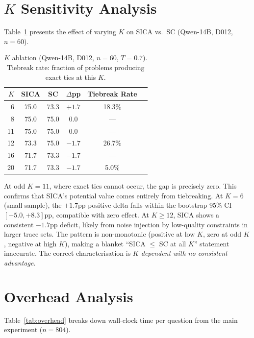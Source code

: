 \documentclass[11pt]{article}
\begin{document}
\appendix

\section{$K$ Sensitivity Analysis}
\label{app:k_ablation}

Table~\ref{tab:k_ablation} presents the effect of varying $K$ on SICA vs.\ SC (Qwen-14B, D012, $n{=}60$).

\begin{table}[h]
\centering
\caption{$K$ ablation (Qwen-14B, D012, $n{=}60$, $T{=}0.7$). Tiebreak rate: fraction of problems producing exact ties at this $K$.}
\label{tab:k_ablation}
\small
\begin{tabular}{@{}rccccr@{}}
\toprule
$K$ & SICA & SC & $\Delta$pp & Tiebreak Rate \\
\midrule
6  & 75.0 & 73.3 & $+1.7$ & 18.3\% \\
8  & 75.0 & 75.0 & $0.0$  & --- \\
11 & 75.0 & 75.0 & $0.0$  & --- \\
12 & 73.3 & 75.0 & $-1.7$ & 26.7\% \\
16 & 71.7 & 73.3 & $-1.7$ & --- \\
20 & 71.7 & 73.3 & $-1.7$ & 5.0\% \\
\bottomrule
\end{tabular}
\end{table}

At odd $K{=}11$, where exact ties cannot occur, the gap is precisely zero.
This confirms that SICA's potential value comes entirely from tiebreaking.
At $K{=}6$ (small sample), the $+1.7$pp positive delta falls within the bootstrap 95\% CI $[-5.0, +8.3]$pp, compatible with zero effect.
At $K{\geq}12$, SICA shows a consistent $-1.7$pp deficit, likely from noise injection by low-quality constraints in larger trace sets.
The pattern is non-monotonic (positive at low $K$, zero at odd $K$, negative at high $K$), making a blanket ``SICA $\leq$ SC at all $K$'' statement inaccurate.
The correct characterisation is \emph{$K$-dependent with no consistent advantage}.

\section{Overhead Analysis}
\label{app:overhead}

Table~\ref{tab:overhead} breaks down wall-clock time per question from the main experiment ($n{=}804$).
\end{document}
